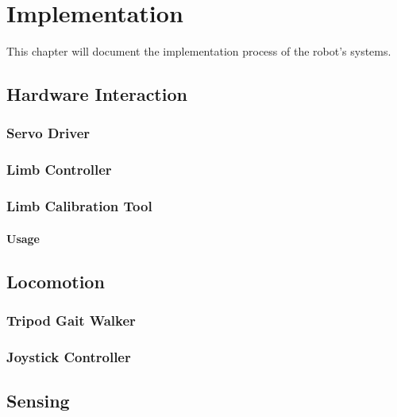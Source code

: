 \chapter{Implementation}


This chapter will document the implementation process of the robot's systems.


\section{Hardware Interaction}

\subsection{Servo Driver}
\subsection{Limb Controller}
\subsection{Limb Calibration Tool}
\subsubsection{Usage}


\section{Locomotion}

\subsection{Tripod Gait Walker}
\subsection{Joystick Controller}


\section{Sensing}

